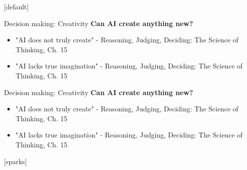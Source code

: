 \documentclass[8pt]{beamer}
\begin{document}
	[default]

	\begin{frame}[t]{Decision making: Creativity}
		\textbf{Can AI create anything new?}
		\begin{itemize}
			\item "AI does not truly create" - Reasoning, Judging, Deciding: The Science of Thinking, Ch. 15
			\item "AI lacks true imagination" - Reasoning, Judging, Deciding: The Science of Thinking, Ch. 15
		\end{itemize}
	\end{frame}

	\begin{frame}[t]{Decision making: Creativity}
		\textbf{Can AI create anything new?}
		\begin{itemize}
			\item "AI does not truly create" - Reasoning, Judging, Deciding: The Science of Thinking, Ch. 15
			\item "AI lacks true imagination" - Reasoning, Judging, Deciding: The Science of Thinking, Ch. 15
		\end{itemize}
		\centering
		\vspace{0.5cm}
	\end{frame}

	[sparks]
\end{document}
